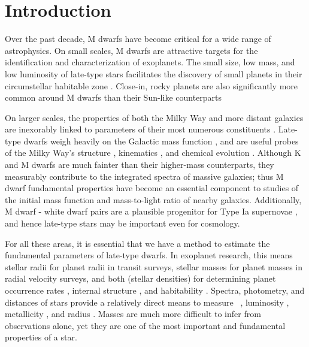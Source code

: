 \documentclass[twocolumn]{aastex62}
\begin{document}
\NewPageAfterKeywords

%



\section{Introduction}\label{sec:intro}
Over the past decade, M dwarfs have become critical for a wide range of astrophysics. On small scales, M dwarfs are attractive targets for the identification and characterization of exoplanets. The small size, low mass, and low luminosity of late-type stars facilitates the discovery of small planets \citep[e.g.][]{Muirhead2012,Martinez:2017aa,Mann:2018} in their circumstellar habitable zone \citep[e.g.,][]{Tarter2007,Shields:2016aa,Dittmann2017b}. Close-in, rocky planets are also significantly more common around M dwarfs than their Sun-like counterparts \citep{Dressing2013,2013PNAS..11019273P,Mulders2015,Gaidos2016b}

On larger scales, the properties of both the Milky Way and more distant galaxies are inexorably linked to parameters of their most numerous constituents \citep[$>70$\% of stars in the Solar neighborhood are M dwarfs,][]{Henry:1994fk,Reid:2004lr}. Late-type dwarfs weigh heavily on the Galactic mass function \citep[e.g.,][]{Covey:2008lr}, and are useful probes of the Milky Way's structure \citep[e.g.,][]{2008ApJ...673..864J,2017ApJ...843..141F}, kinematics \citep[e.g.,][]{2007AJ....134.2418B,2015RAA....15..860Y}, and chemical evolution \citep{Woolf:2012lr,2015AJ....149..140H}. Although K and M dwarfs are much fainter than their higher-mass counterparts, they measurably contribute to the integrated spectra of massive galaxies; thus M dwarf fundamental properties have become an essential component to studies of the initial mass function \citep[e.g.,][]{2012ApJ...747...69C,2016ApJ...821...39M} and mass-to-light ratio \citep{2015MNRAS.452L..21S} of nearby galaxies. Additionally, M dwarf - white dwarf pairs are a plausible progenitor for Type Ia supernovae \citep{2012ApJ...758..123W}, and hence late-type stars may be important even for cosmology.

For all these areas, it is essential that we have a method to estimate the fundamental parameters of late-type dwarfs. In exoplanet research, this means stellar radii for planet radii in transit surveys, stellar masses for planet masses in radial velocity surveys, and both (stellar densities) for determining planet occurrence rates \citep[e.g.,][]{2010exop.book...55W,Gaidos2013}, internal structure \citep[e.g.,][]{Rogers:2011lr}, and habitability \citep[e.g.,][]{Gaidos2013a,Kane2017}. Spectra, photometry, and distances of stars provide a relatively direct means to measure \teff\ \citep[e.g.,][]{Rojas-Ayala:2012uq,Mann2013c}, luminosity \citep[e.g.,][]{2002AJ....124.2721R}, metallicity \citep[e.g.,][]{Bonfils:2005,RojasAyala:2010}, and radius \citep[e.g., via Stefan-Boltzmann, ][]{Newton2015A,Kesseli:2018aa}. Masses are much more difficult to infer from observations alone, yet they are one of the most important and fundamental properties of a star.  
\end{document}
